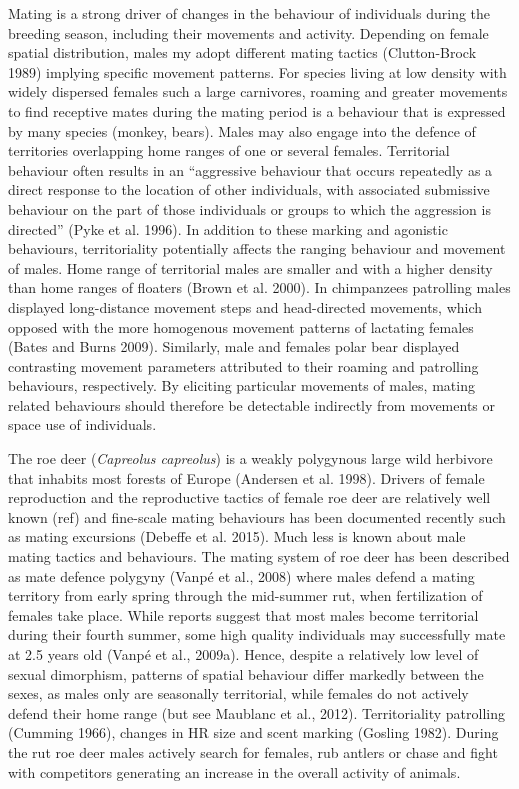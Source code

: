 \documentclass[a4paper,11pt]{article}
\begin{document}
Mating is a strong driver of changes in the behaviour of individuals during the breeding season, including their movements and activity. Depending on female spatial distribution, males my adopt different mating tactics (Clutton-Brock 1989) implying specific movement patterns. For species living at low density with widely dispersed females such a large carnivores, roaming and greater movements to find receptive mates during the mating period is a behaviour that is expressed by many species (monkey, bears). Males may also engage into the defence of territories overlapping home ranges of one or several females. Territorial behaviour often results in an “aggressive behaviour that occurs repeatedly as a direct response to the location of other individuals, with associated submissive behaviour on the part of those individuals or groups to which the aggression is directed” (Pyke et al. 1996). In addition to these marking and agonistic behaviours, territoriality potentially affects the ranging behaviour and movement of males. Home range of territorial males are smaller and with a higher density than home ranges of floaters (Brown et al. 2000). In chimpanzees patrolling males displayed long-distance movement steps and head-directed movements, which opposed with the more homogenous movement patterns of lactating females (Bates and Burns 2009). Similarly, male and females polar bear displayed contrasting movement parameters attributed to their roaming and patrolling behaviours, respectively. By eliciting particular movements of males, mating related behaviours should therefore be detectable indirectly from movements or space use of individuals.

The roe deer (\emph{Capreolus capreolus}) is a weakly polygynous large wild herbivore that inhabits most forests of Europe (Andersen et al. 1998). Drivers of female reproduction and the reproductive tactics of female roe deer are relatively well known (ref) and fine-scale mating behaviours has been documented recently such as mating excursions (Debeffe et al. 2015). Much less is known about male mating tactics and behaviours. The mating system of roe deer has been described as mate defence polygyny (Vanpé et al., 2008) where males defend a mating territory from early spring through the mid-summer rut, when fertilization of females take place. While reports suggest that most males become territorial during their fourth summer, some high quality individuals may successfully mate at 2.5 years old (Vanpé et al., 2009a). Hence, despite a relatively low level of sexual dimorphism, patterns of spatial behaviour differ markedly between the sexes, as males only are seasonally territorial, while females do not actively defend their home range (but see Maublanc et al., 2012). Territoriality patrolling (Cumming 1966), changes in HR size and scent marking (Gosling 1982). During the rut roe deer males actively search for females, rub antlers or chase and fight with competitors generating an increase in the overall activity of animals. 
\end{document}
